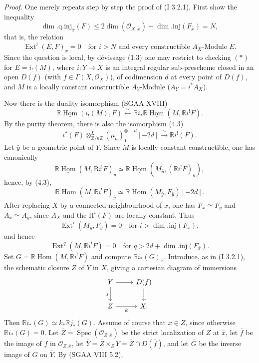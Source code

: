 \documentclass[11pt]{article}
\providecommand{\uH}{\underline{\mathrm H}}
\DeclareMathOperator{\Hom}{Hom}
\DeclareMathOperator{\Ext}{Ext}
\DeclareMathOperator{\Spec}{Spec}
\newcommand{\R}{\mathrm{R}}
\newcommand{\Z}{\mathbb{Z}}
\providecommand{\Hom}{\operatorname{Hom}}
\providecommand{\R}{\mathrm R}
\providecommand{\Z}{\mathbb Z}
\providecommand{\Spec}{\operatorname{Spec}}
\providecommand{\Spec}{\operatorname{Spec}}
\providecommand{\Hom}{\operatorname{Hom}}
\providecommand{\Spec}{\operatorname{Spec}}
\providecommand{\Spec}{\operatorname{Spec}}
\begin{document}
\emph{Proof.} One merely repeats step by step the proof of (I 3.2.1). First show the inequality
\[
        \dim.\mathrm{q.inj}_{\bar{x}}(F)\leq 2\dim(\mathcal{O}_{X,x})+\dim.\mathrm{inj}(F_{\bar{x}})=N,
\]
that is, the relation
\begin{equation}\tag{*}
        \underline{\Ext}^{i}(E,F)_{\bar{x}}=0\quad\text{for } i>N\text{ and every constructible }A_X\text{-Module }E.
\end{equation}
Since the question is local, by dévissage (1.3) one may restrict to checking $(*)$ for $E=i_!(M)$, where $i:Y\to X$ is an integral regular sub-prescheme closed in an open $D(f)$ (with $f\in\Gamma(X,\mathcal{O}_X)$), of codimension $d$ at every point of $D(f)$, and $M$ is a locally constant constructible $A_Y$-Module ($A_Y=i^*A_X$).

Now there is the duality isomorphism (SGAA XVIII)
\[
        \mathbb{R}\underline{\Hom}(i_!(M),F)\xleftarrow{\sim} \mathbb{R} i_*\mathbb{R}\underline{\Hom}(M,\mathbb{R} i^!F).
\]
By the purity theorem, there is also the isomorphism (4.3)
\[
        i^*(F)\otimes^L_{\Z/n\Z}(\mu_n)_Y^{\otimes -d}[-2d]\xrightarrow{\sim}\mathbb{R} i^!(F).
\]
Let $\bar{y}$ be a geometric point of $Y$. Since $M$ is locally constant constructible, one has canonically
\[
        \mathbb{R}\underline{\Hom}(M,\R i^!F)_{\bar{y}}\simeq \mathbb{R}\underline{\Hom}(M_{\bar{y}},(\mathbb{R} i^!F)_{\bar{y}}),
\]
hence, by (4.3),
\[
        \mathbb{R}\underline{\Hom}(M,\mathbb{R} i^!F)_{\bar{y}}\simeq \mathbb{R}\underline{\Hom}(M_{\bar{y}},F_{\bar{y}})[-2d].
\]
After replacing $X$ by a connected neighbourhood of $x$, one has $F_{\bar{x}}\simeq F_{\bar{y}}$ and $A_{\bar{x}}\simeq A_{\bar{y}}$, since $A_X$ and the $\uH^i(F)$ are locally constant. Thus
\[
        \underline{\Ext}^i(M_{\bar{y}},F_{\bar{y}})=0\quad\text{for }i>\dim.\mathrm{inj}(F_{\bar{x}}),
\]
and hence
\[
        \underline{\Ext}^{q}(M,\mathbb{R} i^!F)=0\quad\text{for }q>2d+\dim.\mathrm{inj}(F_{\bar{x}}).
\]
Set $G=\mathbb{R}\underline{\Hom}(M,\mathbb{R} i^!F)$ and compute $\mathbb{R} i_*(G)_{\bar{x}}$. Introduce, as in (I 3.2.1), the schematic closure $Z$ of $Y$ in $X$, giving a cartesian diagram of immersions
\[
\begin{tikzcd}
Y \arrow[r] \arrow[d,"j"'] & D(f) \arrow[d]\\
Z \arrow[r,"k"'] & X.
\end{tikzcd}
\]
Then $\mathbb{R} i_*(G)\simeq k_*\mathbb{R} j_*(G)$. Assume of course that $x\in Z$, since otherwise $\mathbb{R} i_*(G)=0$. Let $\bar{Z}=\Spec(\mathcal{O}_{Z,\bar{x}})$ be the strict localization of $Z$ at $\bar{x}$, let $\bar{f}$ be the image of $f$ in $\mathcal{O}_{Z,\bar{x}}$, let $\bar{Y}=\bar{Z}\times_ZY=\bar{Z}\cap D(\bar{f})$, and let $\bar{G}$ be the inverse image of $G$ on $\bar{Y}$. By (SGAA VIII 5.2),
\end{document}
